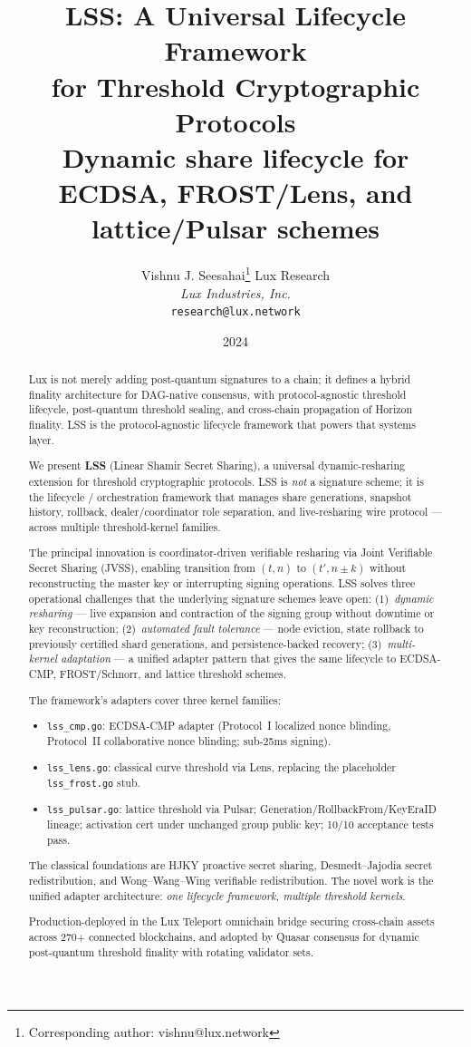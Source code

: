 \documentclass[11pt]{article}
\title{LSS: A Universal Lifecycle Framework\\for Threshold Cryptographic Protocols\\\large{Dynamic share lifecycle for ECDSA, FROST/Lens, and lattice/Pulsar schemes}}
\author{
Vishnu J. Seesahai\thanks{Corresponding author: vishnu@lux.network}
\quad
Lux Research\\
\textit{Lux Industries, Inc.}\\
\texttt{research@lux.network}
}
\date{2024}
\begin{document}
\luxcoverpage

\begin{abstract}
\noindent Lux is not merely adding post-quantum signatures to a chain; it defines a hybrid finality architecture for DAG-native consensus, with protocol-agnostic threshold lifecycle, post-quantum threshold sealing, and cross-chain propagation of Horizon finality. LSS is the protocol-agnostic lifecycle framework that powers that systems layer.

We present \textbf{LSS} (Linear Shamir Secret Sharing), a universal dynamic-resharing extension for threshold cryptographic protocols. LSS is \emph{not} a signature scheme; it is the lifecycle / orchestration framework that manages share generations, snapshot history, rollback, dealer/coordinator role separation, and live-resharing wire protocol --- across multiple threshold-kernel families.

The principal innovation is coordinator-driven verifiable resharing via Joint Verifiable Secret Sharing (JVSS), enabling transition from $(t, n)$ to $(t', n \pm k)$ without reconstructing the master key or interrupting signing operations. LSS solves three operational challenges that the underlying signature schemes leave open:
(1)~\emph{dynamic resharing} --- live expansion and contraction of the signing group without downtime or key reconstruction;
(2)~\emph{automated fault tolerance} --- node eviction, state rollback to previously certified shard generations, and persistence-backed recovery;
(3)~\emph{multi-kernel adaptation} --- a unified adapter pattern that gives the same lifecycle to ECDSA-CMP, FROST/Schnorr, and lattice threshold schemes.

The framework's adapters cover three kernel families:
\begin{itemize}
  \item \texttt{lss\_cmp.go}: ECDSA-CMP adapter (Protocol~I localized nonce blinding, Protocol~II collaborative nonce blinding; sub-25ms signing).
  \item \texttt{lss\_lens.go}: classical curve threshold via Lens, replacing the placeholder \texttt{lss\_frost.go} stub.
  \item \texttt{lss\_pulsar.go}: lattice threshold via Pulsar; Generation/RollbackFrom/KeyEraID lineage; activation cert under unchanged group public key; 10/10 acceptance tests pass.
\end{itemize}

The classical foundations are HJKY proactive secret sharing, Desmedt--Jajodia secret redistribution, and Wong--Wang--Wing verifiable redistribution. The novel work is the unified adapter architecture: \emph{one lifecycle framework, multiple threshold kernels}.

Production-deployed in the Lux Teleport omnichain bridge securing cross-chain assets across 270+ connected blockchains, and adopted by Quasar consensus for dynamic post-quantum threshold finality with rotating validator sets.
\end{abstract}
\end{document}

